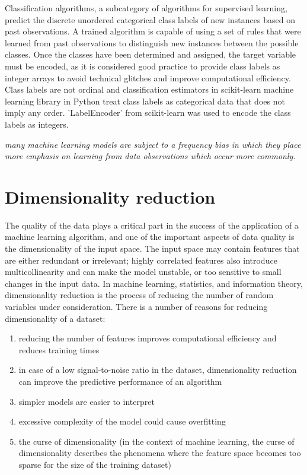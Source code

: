 Classification algorithms, a subcategory of algorithms for supervised learning, predict the discrete unordered categorical class labels of new instances based on past observations.
A trained algorithm is capable of using a set of rules that were learned from past observations to distinguish new instances between the possible classes.
Once the classes have been determined and assigned, the target variable must be encoded, as it is considered good practice to provide class labels as integer arrays to avoid technical glitches and improve computational efficiency.
Class labels are not ordinal and classification estimators in scikit-learn\cite{scikit-learn} machine learning library in Python treat class labels as categorical data that does not imply any order.
'LabelEncoder' from scikit-learn was used to encode the class labels as integers.

\textit{many machine learning models are subject to a frequency bias in which they place more emphasis on learning from data observations which occur more commonly.}


\section{Dimensionality reduction} \label{sec:dimensionality_reduction}

The quality of the data plays a critical part in the success of the application of a machine learning algorithm, and one of the important aspects of data quality is the dimensionality of the input space.
The input space may contain features that are either redundant or irrelevant;
highly correlated features also introduce multicollinearity and can make the model unstable, or too sensitive to small changes in the input data.
In machine learning, statistics, and information theory, dimensionality reduction is the process of reducing the number of random variables under consideration.
There is a number of reasons for reducing dimensionality of a dataset:

\begin{enumerate}
    \item reducing the number of features improves computational efficiency and reduces training times
    \item in case of a low signal-to-noise ratio in the dataset, dimensionality reduction can improve the predictive performance of an algorithm\cite{RaschkaMirjalili2017}
    \item simpler models are easier to interpret\cite{James2013}
    \item excessive complexity of the model could cause overfitting\cite{RaschkaMirjalili2017}
    \item the curse of dimensionality\cite{Bellman1954} (in the context of machine learning, the curse of dimensionality describes the phenomena where the feature space becomes too sparse for the size of the training dataset)\cite{RaschkaMirjalili2017}
\end{enumerate}

